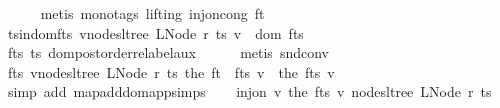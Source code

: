 \begin{isabellebody}
\ \ \ \ \isamarkupfalse%
\ {\isacharparenleft}{\kern0pt}metis\ {\isacharparenleft}{\kern0pt}mono{\isacharunderscore}{\kern0pt}tags{\isacharcomma}{\kern0pt}\ lifting{\isacharparenright}{\kern0pt}\ inj{\isacharunderscore}{\kern0pt}on{\isacharunderscore}{\kern0pt}cong\ f{\isacharunderscore}{\kern0pt}t{\isacharprime}{\kern0pt}{\isacharparenright}{\kern0pt}\isanewline
\ \ \isamarkupfalse%
\ ts{\isacharprime}{\kern0pt}{\isacharunderscore}{\kern0pt}in{\isacharunderscore}{\kern0pt}dom{\isacharunderscore}{\kern0pt}f{\isacharunderscore}{\kern0pt}ts{\isacharcolon}{\kern0pt}\ {\isachardoublequoteopen}{\isasymforall}v{\isasymin}nodes{\isacharunderscore}{\kern0pt}ltree\ {\isacharparenleft}{\kern0pt}LNode\ r{\isacharprime}{\kern0pt}\ ts{\isacharprime}{\kern0pt}{\isacharparenright}{\kern0pt}{\isachardot}{\kern0pt}\ v\ {\isasymin}\ dom\ f{\isacharunderscore}{\kern0pt}ts{\isachardoublequoteclose}\ \isamarkupfalse%
\ f{\isacharunderscore}{\kern0pt}ts\ ts{\isacharprime}{\kern0pt}\ dom{\isacharunderscore}{\kern0pt}postorder{\isacharunderscore}{\kern0pt}relabel{\isacharunderscore}{\kern0pt}aux\isanewline
\ \ \ \ \isamarkupfalse%
\ {\isacharparenleft}{\kern0pt}metis\ snd{\isacharunderscore}{\kern0pt}conv{\isacharparenright}{\kern0pt}\isanewline
\ \ \isamarkupfalse%
\ \isamarkupfalse%
\ f{\isacharunderscore}{\kern0pt}ts{\isacharprime}{\kern0pt}{\isacharcolon}{\kern0pt}\ {\isachardoublequoteopen}{\isasymforall}v{\isasymin}nodes{\isacharunderscore}{\kern0pt}ltree\ {\isacharparenleft}{\kern0pt}LNode\ r{\isacharprime}{\kern0pt}\ ts{\isacharprime}{\kern0pt}{\isacharparenright}{\kern0pt}{\isachardot}{\kern0pt}\ the\ {\isacharparenleft}{\kern0pt}{\isacharparenleft}{\kern0pt}f{\isacharunderscore}{\kern0pt}t\ {\isacharplus}{\kern0pt}{\isacharplus}{\kern0pt}\ f{\isacharunderscore}{\kern0pt}ts{\isacharparenright}{\kern0pt}\ v{\isacharparenright}{\kern0pt}\ {\isacharequal}{\kern0pt}\ the\ {\isacharparenleft}{\kern0pt}f{\isacharunderscore}{\kern0pt}ts\ v{\isacharparenright}{\kern0pt}{\isachardoublequoteclose}\isanewline
\ \ \ \ \isamarkupfalse%
\ {\isacharparenleft}{\kern0pt}simp\ add{\isacharcolon}{\kern0pt}\ map{\isacharunderscore}{\kern0pt}add{\isacharunderscore}{\kern0pt}dom{\isacharunderscore}{\kern0pt}app{\isacharunderscore}{\kern0pt}simps{\isacharparenleft}{\kern0pt}{}{\isacharparenright}{\kern0pt}{\isacharparenright}{\kern0pt}\isanewline
\ \ \isamarkupfalse%
\ {\isachardoublequoteopen}inj{\isacharunderscore}{\kern0pt}on\ {\isacharparenleft}{\kern0pt}{\isasymlambda}v{\isachardot}{\kern0pt}\ the\ {\isacharparenleft}{\kern0pt}f{\isacharunderscore}{\kern0pt}ts\ v{\isacharparenright}{\kern0pt}{\isacharparenright}{\kern0pt}\ {\isacharparenleft}{\kern0pt}nodes{\isacharunderscore}{\kern0pt}ltree\ {\isacharparenleft}{\kern0pt}LNode\ r{\isacharprime}{\kern0pt}\ ts{\isacharprime}{\kern0pt}{\isacharparenright}{\kern0pt}{\isacharparenright}{\kern0pt}{\isachardoublequoteclose}\ \isamarkupfalse%

\end{isabellebody}
